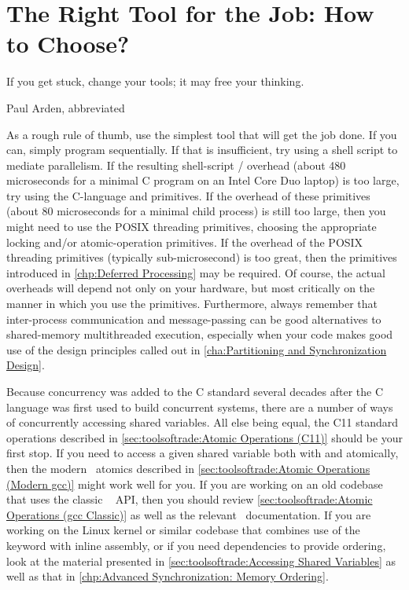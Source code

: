\section{The Right Tool for the Job:
					How to Choose?}
\label{sec:toolsoftrade:The Right Tool for the Job: How to Choose?}
%
\epigraph{If you get stuck, change your tools; it may free your thinking.}
	 {Paul Arden, abbreviated}

As a rough rule of thumb, use the simplest tool that will get the job done.
If you can, simply program sequentially.
If that is insufficient, try using a shell script to mediate parallelism.
If the resulting shell-script / overhead
(about 480 microseconds for a minimal C program on an Intel Core Duo
laptop) is too
large, try using the C-language  and  primitives.
If the overhead of these primitives (about 80 microseconds for a minimal
child process) is still too large, then you
might need to use the POSIX threading primitives, choosing the appropriate
locking and/or atomic-operation primitives.
If the overhead of the POSIX threading primitives (typically sub-microsecond)
is too great, then the primitives introduced in
\cref{chp:Deferred Processing} may be required.
Of course, the actual overheads will depend not only on your hardware,
but most critically on the manner in which you use the primitives.
Furthermore, always remember that inter-process communication and
message-passing can be good alternatives to shared-memory multithreaded
execution, especially when your code makes good use of the design
principles called out in
\cref{cha:Partitioning and Synchronization Design}.

\QuickQuizEnd

Because concurrency was added to the C standard several decades after
the C language was first used to build concurrent systems, there are
a number of ways of concurrently accessing shared variables.
All else being equal, the C11 standard operations described in
\cref{sec:toolsoftrade:Atomic Operations (C11)}
should be your first stop.
If you need to access a given shared variable both with 
and atomically, then the modern \GCC\ atomics described in
\cref{sec:toolsoftrade:Atomic Operations (Modern gcc)}
might work well for you.
If you are working on an old codebase that uses the classic \GCC\ 
API, then you should review
\cref{sec:toolsoftrade:Atomic Operations (gcc Classic)}
as well as the relevant \GCC\ documentation.
If you are working on the Linux kernel or similar codebase that
combines use of the  keyword with inline assembly,
or if you need dependencies to provide ordering, look at the material
presented in \cref{sec:toolsoftrade:Accessing Shared Variables}
as well as that in
\cref{chp:Advanced Synchronization: Memory Ordering}.

